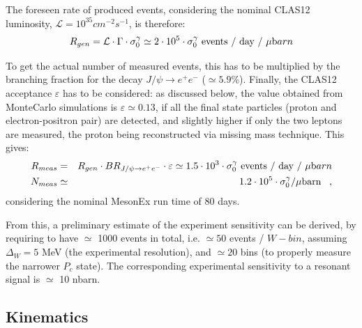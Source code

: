 The foreseen rate of produced events, considering the nominal CLAS12 luminosity, $\mathcal{L}=10^{35} cm^{-2} s^{-1}$, is therefore:
 \begin{equation}
R_{gen} = \mathcal{L} \cdot \Gamma \cdot \sigma^{\gamma}_0 \simeq 2 \cdot 10^5 \cdot \sigma^{\gamma}_0 \mbox{ events / day / }\mu{\mbox barn}
\end{equation}

To get the actual number of measured events, this has to be multiplied by the branching fraction for the decay $J/\psi\rightarrow e^{+} e^{-}$ ($\simeq 5.9\%$). 
Finally, the CLAS12 acceptance $\varepsilon$ has to be considered: as discussed below, the value obtained from MonteCarlo simulations is $\varepsilon \simeq 0.13$, if all the final state particles (proton and electron-positron pair) are detected, and slightly higher if only the two leptons are measured, the proton being reconstructed via missing mass technique. This gives:
\begin{eqnarray}
R_{meas} &=& R_{gen} \cdot BR_{J/\psi\rightarrow e^{+}e^{-}} \cdot \varepsilon \simeq 1.5 \cdot 10^{3}  \cdot \sigma^{\gamma}_0 \mbox{ events / day / }\mu{\mbox barn}\\
 N_{meas} &\simeq& 1.2\cdot10^5 \cdot \sigma^{\gamma}_0 / \mu\mbox{barn} \; \; \; ,
\end{eqnarray}
considering the nominal MesonEx run time of 80 days. 

From this, a preliminary estimate of the experiment sensitivity can be derived, by requiring to have $\simeq$ 1000 events in total, i.e. $\simeq 50$ events / $W-bin$, assuming $\Delta_W=5$ MeV (the experimental resolution), and $\simeq 20$ bins 
(to properly measure the narrower $P_c$ state). The corresponding experimental sensitivity to a resonant signal is $\simeq$ 10 nbarn.


\subsection{Kinematics}
 
